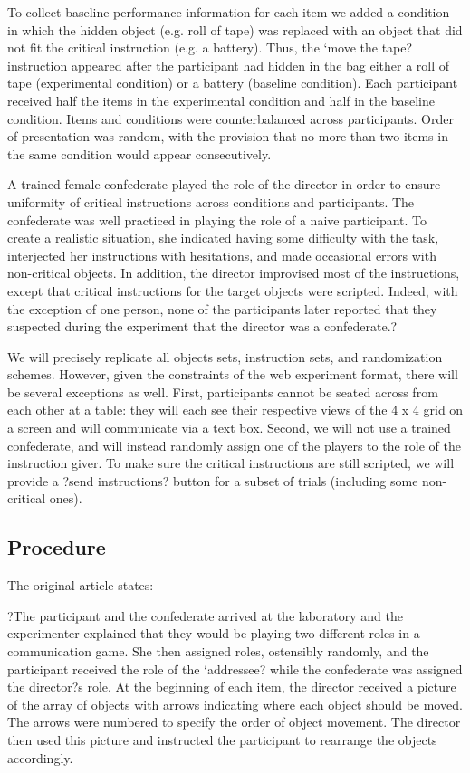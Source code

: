 \documentclass[10pt,letterpaper]{article}
\begin{document}
To collect baseline performance information for each item we added a condition in which the hidden object (e.g. roll of tape) was replaced with an object that did not fit the critical instruction (e.g. a battery). Thus, the `move the tape? instruction appeared after the participant had hidden in the bag either a roll of tape (experimental condition) or a battery (baseline condition). Each participant received half the items in the experimental condition and half in the baseline condition. Items and conditions were counterbalanced across participants. Order of presentation was random, with the provision that no more than two items in the same condition would appear consecutively.

A trained female confederate played the role of the director in order to ensure uniformity of critical instructions across conditions and participants. The confederate was well practiced in playing the role of a naive participant. To create a realistic situation, she indicated having some difficulty with the task, interjected her instructions with hesitations, and made occasional errors with non-critical objects. In addition, the director improvised most of the instructions, except that critical instructions for the target objects were scripted. Indeed, with the exception of one person, none of the participants later reported that they suspected during the experiment that the director was a confederate.?

We will precisely replicate all objects sets, instruction sets, and randomization schemes. However, given the constraints of the web experiment format, there will be several exceptions as well. First, participants cannot be seated across from each other at a table: they will each see their respective views of the 4 x 4 grid on a screen and will communicate via a text box. Second, we will not use a trained confederate, and will instead randomly assign one of the players to the role of the instruction giver. To make sure the critical instructions are still scripted, we will provide a ?send instructions? button for a subset of trials (including some non-critical ones).

\subsection{Procedure}

The original article states:

?The participant and the confederate arrived at the laboratory and the experimenter explained that they would be playing two different roles in a communication game. She then assigned roles, ostensibly randomly, and the participant received the role of the `addressee? while the confederate was assigned the director?s role. At the beginning of each item, the director received a picture of the array of objects with arrows indicating where each object should be moved. The arrows were numbered to specify the order of object movement. The director then used this picture and instructed the participant to rearrange the objects accordingly.
\end{document}
